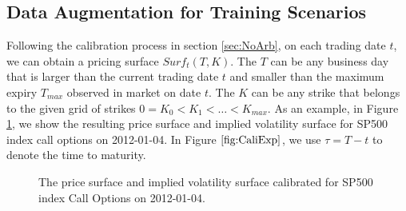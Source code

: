\documentclass[letterpaper,12pt,titlepage,oneside,final]{book}
\numberwithin{equation}{section}
\theoremstyle{definition}
\begin{document}
\subsection{Data Augmentation for Training Scenarios}
\label{sec:Augtrain}
Following the calibration process in section \ref{sec:NoArb}, on each trading date $t$, we can obtain a pricing surface $Surf_{t}(T,K)$. The $T$ can be any business day that is larger than the current trading date $t$ and smaller than the maximum expiry $T_{max}$ observed in market on date $t$. The $K$ can be any strike that belongs to the given grid of strikes $0=K_0<K_1<\dots<K_{max}$. As an example, in Figure \ref{fig:CaliExp}, we show the resulting price surface and implied  volatility surface for SP500 index call options  on 2012-01-04. In Figure $\ref{fig:CaliExp}$, we use $\tau=T-t$ to denote the time to maturity.
\begin{figure}[htp!]
	\centering
	\caption{The price surface and implied volatility surface calibrated for SP500 index Call Options on 2012-01-04.}
	\label{fig:CaliExp}
\end{figure}
\end{document}
